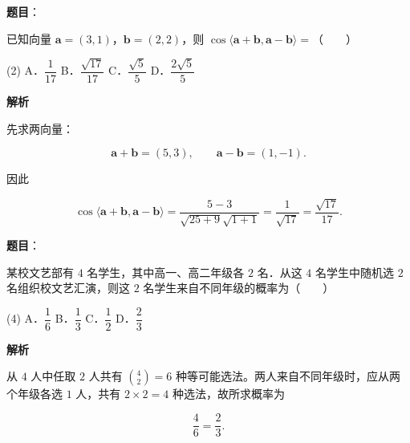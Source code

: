 \begin{answer}

\textbf{题目}：

已知向量 $\boldsymbol a=(3,1)$，$\boldsymbol b=(2,2)$，则 $\cos\langle\boldsymbol a+\boldsymbol b,\boldsymbol a-\boldsymbol b\rangle=$\mbox{（　　）}

\begin{gkopts}(2)
\task A．$\dfrac1{17}$
\task B．$\dfrac{\sqrt{17}}{17}$
\task C．$\dfrac{\sqrt5}{5}$
\task D．$\dfrac{2\sqrt5}{5}$
\end{gkopts}

\textbf{解析}

先求两向量：

\nopagebreak[4]
\[
\boldsymbol a+\boldsymbol b=(5,3),\qquad
\boldsymbol a-\boldsymbol b=(1,-1).
\]

因此

\nopagebreak[4]
\[
\cos\langle\boldsymbol a+\boldsymbol b,\boldsymbol a-\boldsymbol b\rangle
=\frac{5-3}{\sqrt{25+9}\sqrt{1+1}}
=\frac1{\sqrt{17}}=\frac{\sqrt{17}}{17}.
\]


\end{answer}
\begin{answer}

\textbf{题目}：

某校文艺部有 $4$ 名学生，其中高一、高二年级各 $2$ 名．从这 $4$ 名学生中随机选 $2$ 名组织校文艺汇演，则这 $2$ 名学生来自不同年级的概率为\mbox{（　　）}

\begin{gkopts}(4)
\task A．$\dfrac16$
\task B．$\dfrac13$
\task C．$\dfrac12$
\task D．$\dfrac23$
\end{gkopts}

\textbf{解析}

从 $4$ 人中任取 $2$ 人共有 $\binom42=6$ 种等可能选法。两人来自不同年级时，应从两个年级各选 $1$ 人，共有 $2\times2=4$ 种选法，故所求概率为

\nopagebreak[4]
\[
\frac46=\frac23.
\]


\end{answer}
